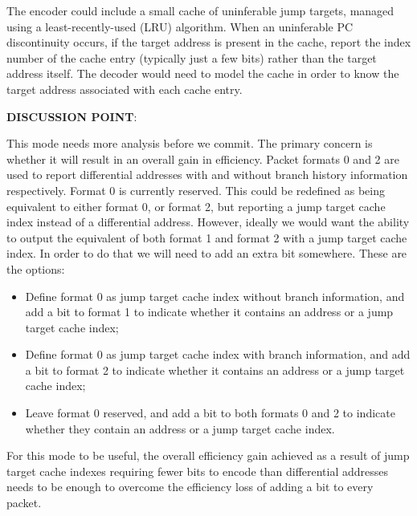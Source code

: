 The encoder could include a small cache of uninferable jump targets, managed using a
least-recently-used (LRU) algorithm.  When an uninferable PC discontinuity occurs, if 
the target address is present in the cache, report the index number of the cache
entry (typically just a few bits) rather than the target address itself.  The decoder 
would need to model the cache in order to know the target address associated with
each cache entry.

\textbf{DISCUSSION POINT}:

This mode needs more analysis before we commit.  The primary concern is whether it will 
result in an overall gain in efficiency.  Packet formats 0 and 2 are used to report 
differential addresses with and without branch history information respectively.  Format
0 is currently reserved.  This could be redefined as being equivalent to either format 0, or 
format 2, but reporting a jump target cache index instead of a differential address.
However, ideally we would want the ability to output the equivalent of both format 1 and
format 2 with a jump target cache index.  In order to do that we will need to add an extra bit
somewhere.  These are the options:

\begin{itemize}
  \item Define format 0 as jump target cache index without branch information, and add a bit to
    format 1 to indicate whether it contains an address or a jump target cache index;
  \item Define format 0 as jump target cache index with branch information, and add a bit to
    format 2 to indicate whether it contains an address or a jump target cache index;
  \item Leave format 0 reserved, and add a bit to both formats 0 and 2 to indicate whether
    they contain an address or a jump target cache index.
\end{itemize}

For this mode to be useful, the overall efficiency gain achieved as a result of jump target cache indexes
requiring fewer bits to encode than differential addresses needs to be enough to overcome the efficiency
loss of adding a bit to every packet. 
